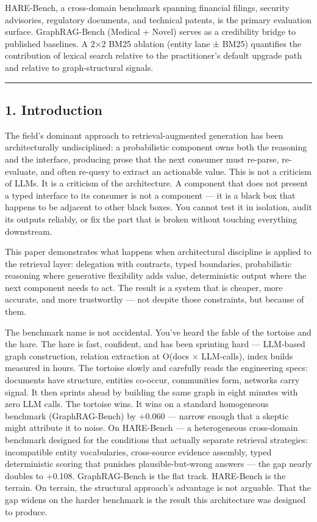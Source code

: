 HARE-Bench, a cross-domain benchmark spanning financial filings, security advisories, regulatory documents, and technical patents, is the primary evaluation surface. GraphRAG-Bench (Medical + Novel) serves as a credibility bridge to published baselines. A 2×2 BM25 ablation (entity lane ± BM25) quantifies the contribution of lexical search relative to the practitioner's default upgrade path and relative to graph-structural signals.

\begin{center}\rule{0.5\linewidth}{0.5pt}\end{center}

\subsection{1. Introduction}\label{introduction}

The field's dominant approach to retrieval-augmented generation has been architecturally undisciplined: a probabilistic component owns both the reasoning and the interface, producing prose that the next consumer must re-parse, re-evaluate, and often re-query to extract an actionable value. This is not a criticism of LLMs. It is a criticism of the architecture. A component that does not present a typed interface to its consumer is not a component --- it is a black box that happens to be adjacent to other black boxes. You cannot test it in isolation, audit its outputs reliably, or fix the part that is broken without touching everything downstream.

This paper demonstrates what happens when architectural discipline is applied to the retrieval layer: delegation with contracts, typed boundaries, probabilistic reasoning where generative flexibility adds value, deterministic output where the next component needs to act. The result is a system that is cheaper, more accurate, and more trustworthy --- not despite those constraints, but because of them.

The benchmark name is not accidental. You've heard the fable of the tortoise and the hare. The hare is fast, confident, and has been sprinting hard --- LLM-based graph construction, relation extraction at O(docs × LLM-calls), index builds measured in hours. The tortoise slowly and carefully reads the engineering specs: documents have structure, entities co-occur, communities form, networks carry signal. It then sprints ahead by building the same graph in eight minutes with zero LLM calls. The tortoise wins. It wins on a standard homogeneous benchmark (GraphRAG-Bench) by +0.060 --- narrow enough that a skeptic might attribute it to noise. On HARE-Bench --- a heterogeneous cross-domain benchmark designed for the conditions that actually separate retrieval strategies: incompatible entity vocabularies, cross-source evidence assembly, typed deterministic scoring that punishes plausible-but-wrong answers --- the gap nearly doubles to +0.108. GraphRAG-Bench is the flat track. HARE-Bench is the terrain. On terrain, the structural approach's advantage is not arguable. That the gap widens on the harder benchmark is the result this architecture was designed to produce.

